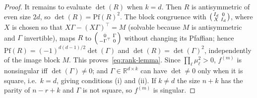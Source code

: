 \documentclass[10pt,a4paper]{amsart}
\begin{document}
\begin{proof}
	It remains to evaluate $\det(R)$ when $k=d$. Then $R$ is antisymmetric of even size $2d$, so $\det(R)=\mathrm{Pf}(R)^2$. The block congruence with $\begin{psmallmatrix} I_d & 0 \\ X & I_d \end{psmallmatrix}$, where $X$ is chosen so that $X\Gamma - (X\Gamma)^{\top} = M$ (solvable because $M$ is antisymmetric and $\Gamma$ invertible), maps $R$ to $\begin{psmallmatrix} 0 & \Gamma \\ -\Gamma^{\top} & 0 \end{psmallmatrix}$ without changing its Pfaffian; hence $\mathrm{Pf}(R) = (-1)^{d(d-1)/2}\det(\Gamma)$ and $\det(R)=\det(\Gamma)^2$, independently of the image block $M$. This proves~\eqref{eq:rank-lemma}. Since $\prod_\ell\mu_\ell^2>0$, $f^{(m)}$ is nonsingular iff $\det(\Gamma)\neq 0$; and $\Gamma\in\mathbb{R}^{d\times k}$ can have $\det\neq 0$ only when it is square, i.e.\ $k=d$, giving conditions (i) and (ii). If $k\neq d$ the size $n+k$ has the parity of $n-r+k$ and $\Gamma$ is not square, so $f^{(m)}$ is singular.
\end{proof}
\end{document}
